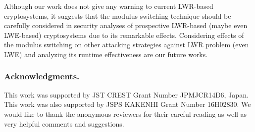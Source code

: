 \documentclass[runningheads]{llncs}
\begin{document}
Although our work does not give any warning to current LWR-based cryptosystems, it suggests that the modulus switching technique should be carefully considered in security analyses of prospective LWR-based (maybe even LWE-based) cryptosystems due to its remarkable effects. Considering effects of the modulus switching on other attacking strategies against LWR problem (even LWE) and analyzing its runtime effectiveness are our future works.  

\subsubsection{Acknowledgments.} This work was supported by JST CREST Grant Number JPMJCR14D6, Japan. This work was also supported by JSPS KAKENHI Grant Number 16H02830.
We would like to thank the anonymous reviewers for their careful reading as well as very helpful comments and suggestions.
\medskip


\end{document}
